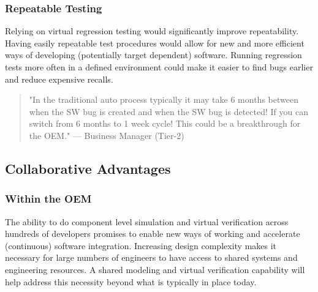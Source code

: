 \subsubsection{Repeatable Testing}
Relying on virtual regression testing would significantly improve repeatability.
Having easily repeatable test procedures would allow for new and more efficient ways of developing (potentially target dependent) software. Running regression tests more often in a defined environment could make it easier to find bugs earlier and reduce expensive recalls.
\begin{quote}
"In the traditional auto process typically it may take 6 months between when the SW bug is created and when the SW bug is detected! If you can switch from 6 months to 1 week cycle! This could be a breakthrough for the OEM."
— Business Manager (Tier-2)
\end{quote}

\subsection{Collaborative Advantages}

\subsubsection{Within the OEM}
The ability to do component level simulation and virtual verification across hundreds of developers promises to enable new ways of working and accelerate (continuous) software integration.
Increasing design complexity makes it necessary for large numbers of engineers to have access to shared systems and engineering resources. A shared modeling and virtual verification capability will help address this necessity beyond what is typically in place today.

